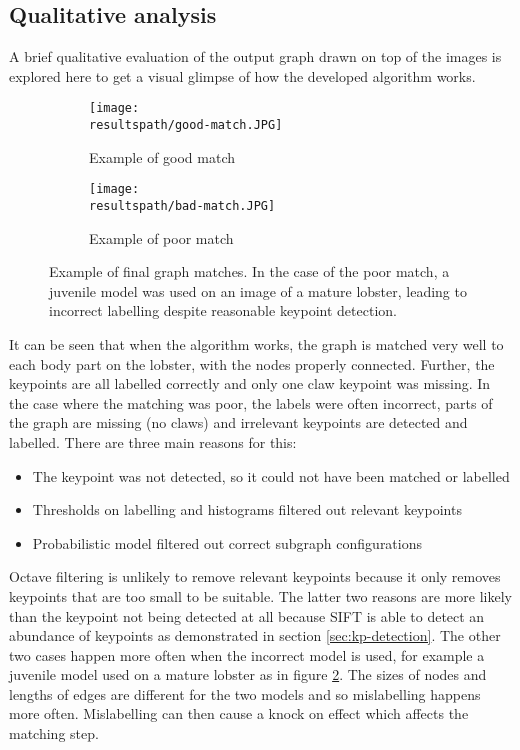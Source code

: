 \subsection{Qualitative analysis}
A brief qualitative evaluation of the output graph drawn on top of the images is explored here to get a visual glimpse of how the developed algorithm works.
\begin{figure}[H]
	\begin{subfigure}{0.45\textwidth}
	\texttt{[image: \\resultspath/good-match.JPG]}
	\caption{Example of good match}
	\end{subfigure}
	\hspace*{\fill}
	\begin{subfigure}{0.45\textwidth}
	\texttt{[image: \\resultspath/bad-match.JPG]}
	\label{fig:poor-match}
	\caption{Example of poor match}
	\end{subfigure}
\caption{Example of final graph matches. In the case of the poor match, a juvenile model was used on an image of a mature lobster, leading to incorrect labelling despite reasonable keypoint detection.}
\end{figure}
\noindent
It can be seen that when the algorithm works, the graph is matched very well to each body part on the lobster, with the nodes properly connected. Further, the keypoints are all labelled correctly and only one claw keypoint was missing. In the case where the matching was poor, the labels were often incorrect, parts of the graph are missing (no claws) and irrelevant keypoints are detected and labelled. There are three main reasons for this:
\begin{itemize}
\item The keypoint was not detected, so it could not have been matched or labelled
\item Thresholds on labelling and histograms filtered out relevant keypoints
\item Probabilistic model filtered out correct subgraph configurations 
\end{itemize}
Octave filtering is unlikely to remove relevant keypoints because it only removes keypoints that are too small to be suitable. The latter two reasons are more likely than the keypoint not being detected at all because SIFT is able to detect an abundance of keypoints as demonstrated in section \ref{sec:kp-detection}. The other two cases happen more often when the incorrect model is used, for example a juvenile model used on a mature lobster as in figure \ref{fig:poor-match}. The sizes of nodes and lengths of edges are different for the two models and so mislabelling happens more often. Mislabelling can then cause a knock on effect which affects the matching step.

